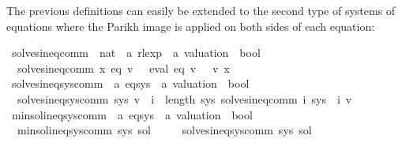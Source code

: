 \begin{isabellebody}
\begin{isamarkuptext}
The previous definitions can easily be extended to the second type of systems of equations
where the Parikh image is applied on both sides of each equation:%
\end{isamarkuptext}\isamarkuptrue%
\isamarkupfalse%
\ solves{\isacharunderscore}{\kern0pt}ineq{\isacharunderscore}{\kern0pt}comm\ {\isacharcolon}{\kern0pt}{\isacharcolon}{\kern0pt}\ {\isachardoublequoteopen}nat\ {\isasymRightarrow}\ {\isacharprime}{\kern0pt}a\ rlexp\ {\isasymRightarrow}\ {\isacharprime}{\kern0pt}a\ valuation\ {\isasymRightarrow}\ bool{\isachardoublequoteclose}\ \isanewline
\ \ {\isachardoublequoteopen}solves{\isacharunderscore}{\kern0pt}ineq{\isacharunderscore}{\kern0pt}comm\ x\ eq\ v\ {\isasymequiv}\ {\isasymPsi}\ {\isacharparenleft}{\kern0pt}eval\ eq\ v{\isacharparenright}{\kern0pt}\ {\isasymsubseteq}\ {\isasymPsi}\ {\isacharparenleft}{\kern0pt}v\ x{\isacharparenright}{\kern0pt}{\isachardoublequoteclose}\isanewline
\isanewline
{}\isamarkupfalse%
\ solves{\isacharunderscore}{\kern0pt}ineq{\isacharunderscore}{\kern0pt}sys{\isacharunderscore}{\kern0pt}comm\ {\isacharcolon}{\kern0pt}{\isacharcolon}{\kern0pt}\ {\isachardoublequoteopen}{\isacharprime}{\kern0pt}a\ eq{\isacharunderscore}{\kern0pt}sys\ {\isasymRightarrow}\ {\isacharprime}{\kern0pt}a\ valuation\ {\isasymRightarrow}\ bool{\isachardoublequoteclose}\ \isanewline
\ \ {\isachardoublequoteopen}solves{\isacharunderscore}{\kern0pt}ineq{\isacharunderscore}{\kern0pt}sys{\isacharunderscore}{\kern0pt}comm\ sys\ v\ {\isasymequiv}\ {\isasymforall}i\ {\isacharless}{\kern0pt}\ length\ sys{\isachardot}{\kern0pt}\ solves{\isacharunderscore}{\kern0pt}ineq{\isacharunderscore}{\kern0pt}comm\ i\ {\isacharparenleft}{\kern0pt}sys\ {\isacharbang}{\kern0pt}\ i{\isacharparenright}{\kern0pt}\ v{\isachardoublequoteclose}\isanewline
\isanewline
{}\isamarkupfalse%
\ min{\isacharunderscore}{\kern0pt}sol{\isacharunderscore}{\kern0pt}ineq{\isacharunderscore}{\kern0pt}sys{\isacharunderscore}{\kern0pt}comm\ {\isacharcolon}{\kern0pt}{\isacharcolon}{\kern0pt}\ {\isachardoublequoteopen}{\isacharprime}{\kern0pt}a\ eq{\isacharunderscore}{\kern0pt}sys\ {\isasymRightarrow}\ {\isacharprime}{\kern0pt}a\ valuation\ {\isasymRightarrow}\ bool{\isachardoublequoteclose}\ \isanewline
\ \ {\isachardoublequoteopen}min{\isacharunderscore}{\kern0pt}sol{\isacharunderscore}{\kern0pt}ineq{\isacharunderscore}{\kern0pt}sys{\isacharunderscore}{\kern0pt}comm\ sys\ sol\ {\isasymequiv}\isanewline
\ \ \ \ solves{\isacharunderscore}{\kern0pt}ineq{\isacharunderscore}{\kern0pt}sys{\isacharunderscore}{\kern0pt}comm\ sys\ sol\ {\isasymand}\isanewline

\end{isabellebody}
